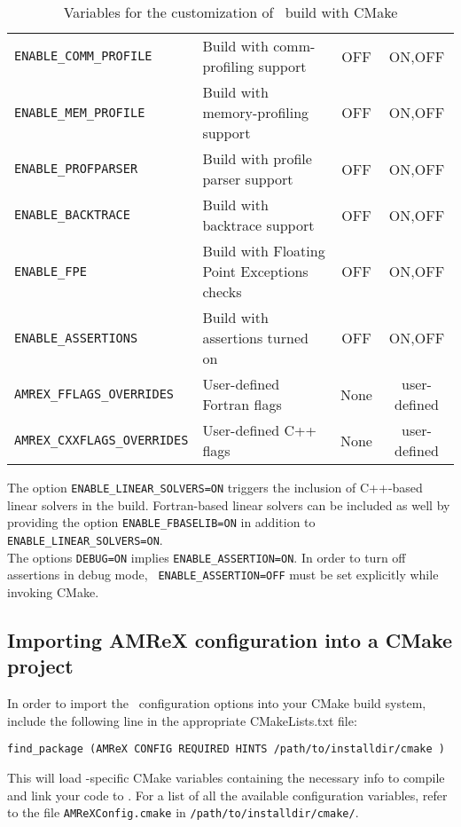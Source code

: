 \begin{table}[h!]
{\begin{tabular}{llcc}
    {\tt ENABLE\_COMM\_PROFILE} &  Build with comm-profiling support & OFF  & ON,OFF \\
    {\tt ENABLE\_MEM\_PROFILE} &  Build with memory-profiling support & OFF  & ON,OFF \\
    {\tt ENABLE\_PROFPARSER} &  Build with profile parser support & OFF  & ON,OFF \\
    {\tt ENABLE\_BACKTRACE} & Build with backtrace support & OFF  & ON,OFF \\
    {\tt ENABLE\_FPE} & Build with Floating Point Exceptions checks & OFF  & ON,OFF \\
    {\tt ENABLE\_ASSERTIONS} & Build with assertions turned on  & OFF  & ON,OFF \\
    {\tt AMREX\_FFLAGS\_OVERRIDES} &  User-defined Fortran flags & None  & user-defined \\
    {\tt AMREX\_CXXFLAGS\_OVERRIDES} &  User-defined C++ flags & None  & user-defined \\
    \hline
  \end{tabular}
  }
  \caption{\label{tab:cmakevar} Variables for the customization of \amrex\ build with CMake}
\end{table}


The option {\tt ENABLE\_LINEAR\_SOLVERS=ON} triggers the inclusion of C++-based linear
solvers in the build. Fortran-based linear solvers can be included
as well by providing  the option {\tt ENABLE\_FBASELIB=ON} in addition
to  {\tt ENABLE\_LINEAR\_SOLVERS=ON}.\\
The options {\tt DEBUG=ON} implies {\tt ENABLE\_ASSERTION=ON}. In
order to turn off assertions in debug mode, {\tt
  ENABLE\_ASSERTION=OFF} must be set explicitly while invoking CMake.

\subsection{Importing AMReX configuration into a CMake project}
\label{sec:build:cmake:config}
In order to import the \amrex\ configuration options into your CMake
build system, include the following line in the appropriate
CMakeLists.txt file:
\begin{verbatim}
find_package (AMReX CONFIG REQUIRED HINTS /path/to/installdir/cmake )
\end{verbatim}
This will load \amrex-specific CMake variables containing the necessary
info to compile and link your code to \amrex. For a list of all the available
configuration variables, refer to the file {\tt AMReXConfig.cmake} in
{\tt /path/to/installdir/cmake/}.



